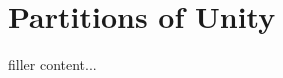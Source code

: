 \documentclass[../../templates/section]{subfiles}
\begin{document}
\section{Partitions of Unity}\label{sec:partitions-of-unity}

filler content...
\end{document}

